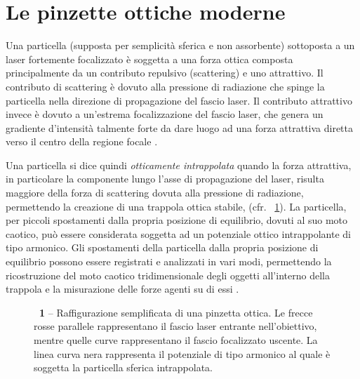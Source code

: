 \section*{Le pinzette ottiche moderne}

Una particella (supposta per semplicità sferica e non assorbente)  sottoposta a un laser fortemente focalizzato è soggetta a una forza ottica composta principalmente da un contributo repulsivo (scattering) e  uno attrattivo. Il contributo di scattering è dovuto alla pressione di radiazione che spinge la particella nella direzione di propagazione del fascio laser. Il contributo attrattivo invece è dovuto a un'estrema focalizzazione del fascio laser, che genera un gradiente d'intensità talmente forte da dare luogo ad una forza attrattiva diretta verso il centro della regione focale \cite{omori1997observation}.

Una particella si dice quindi \emph{otticamente intrappolata} quando la forza attrattiva, in particolare la componente lungo l'asse di propagazione del laser, risulta maggiore della forza di scattering dovuta alla pressione di radiazione, permettendo la creazione di una trappola ottica stabile, (cfr. \figurename~\ref{fig:ot}).
La particella, per piccoli spostamenti dalla propria posizione di equilibrio, dovuti al suo moto caotico, può essere considerata soggetta ad un potenziale ottico intrappolante di tipo armonico.
Gli spostamenti della particella dalla propria posizione di equilibrio possono essere registrati e analizzati in vari modi, permettendo la ricostruzione del moto caotico tridimensionale degli oggetti all'interno della trappola e la misurazione delle forze agenti su di essi \cite{magazzuoptical}.

\begin{figure}[!b]
\begin{center}
\caption{\textbf{\figurename~1} -- Raffigurazione semplificata di una pinzetta ottica. Le frecce rosse parallele rappresentano il fascio laser  entrante nell'obiettivo, mentre quelle curve rappresentano il fascio focalizzato uscente. La linea curva nera rappresenta il potenziale di tipo armonico al quale è soggetta la particella sferica intrappolata.}
\label{fig:ot}
\end{center}
\vskip-20pt
\end{figure}

